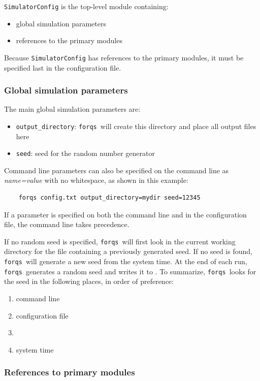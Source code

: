 \documentclass{article}
\newcommand{\forqs}[0]{\texttt{forqs }}
\begin{document}
\texttt{SimulatorConfig} is the top-level module containing:
\begin{itemize}
    \item global simulation parameters
    \item references to the primary modules
\end{itemize}
Because \texttt{SimulatorConfig} has references to the primary modules, it must
be specified last in the configuration file.


\subsubsection{Global simulation parameters}

The main global simulation parameters are:
\begin{itemize}
    \item \texttt{output\_directory}: \forqs will create this directory and
        place all output files here
    \item \texttt{seed}: seed for the random number generator
\end{itemize}

Command line parameters can also be specified on the command line as
\emph{name=value} with no whitespace, as shown in this example:
\begin{small}
\begin{verbatim}
    forqs config.txt output_directory=mydir seed=12345
\end{verbatim}
\end{small}
If a parameter is specified on both the command line and in the configuration
file, the command line takes precedence.  

If no random seed is specified, \forqs will first look in the current working
directory for the file  containing a previously generated
seed.  If no seed is found, \forqs will generate a new seed from the system
time.  At the end of each run, \forqs generates a random seed and writes it to
.  To summarize, \forqs looks for the seed in the following
places, in order of preference:
\begin{enumerate}
    \item command line
    \item configuration file
    \item {}
    \item system time
\end{enumerate}


\subsubsection{References to primary modules}
\end{document}
